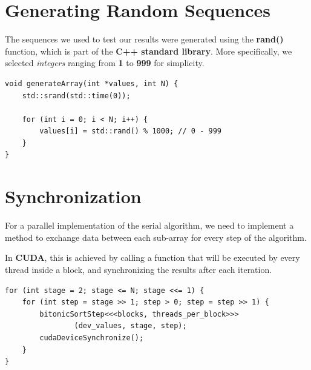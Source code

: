 \documentclass[12pt]{report}
\begin{document}
\section{Generating Random Sequences}
The sequences we used to test our results were generated using the \textbf{rand()} function, which is part of the \textbf{C++ standard library}. More specifically, we selected \textit{integers} ranging from \textbf{1} to \textbf{999} for simplicity.
\begin{lstlisting}[style=cppstyle]
void generateArray(int *values, int N) {
    std::srand(std::time(0));

    for (int i = 0; i < N; i++) {
        values[i] = std::rand() % 1000; // 0 - 999
    }
}
\end{lstlisting}

\section{Synchronization}
For a parallel implementation of the serial algorithm, we need to implement a method to exchange data between each sub-array for every step of the algorithm.

In \textbf{CUDA}, this is achieved by calling a function that will be executed by every thread inside a block, and synchronizing the results after each iteration.
\begin{lstlisting}[style=cppstyle]
for (int stage = 2; stage <= N; stage <<= 1) {
    for (int step = stage >> 1; step > 0; step = step >> 1) {
        bitonicSortStep<<<blocks, threads_per_block>>>
                (dev_values, stage, step);
        cudaDeviceSynchronize();
    }
}
\end{lstlisting}
\end{document}
